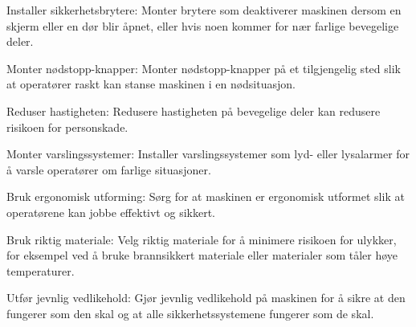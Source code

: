 \documentclass[aspectratio=169,xcolor=dvipsnames]{beamer}
\begin{document}
\begin{frame}
\begin{itemize}
{Installer sikkerhetsbrytere: Monter brytere som deaktiverer maskinen dersom en skjerm eller en dør blir åpnet, eller hvis noen kommer for nær farlige bevegelige deler.

Monter nødstopp-knapper: Monter nødstopp-knapper på et tilgjengelig sted slik at operatører raskt kan stanse maskinen i en nødsituasjon.

Reduser hastigheten: Redusere hastigheten på bevegelige deler kan redusere risikoen for personskade.

Monter varslingssystemer: Installer varslingssystemer som lyd- eller lysalarmer for å varsle operatører om farlige situasjoner.

Bruk ergonomisk utforming: Sørg for at maskinen er ergonomisk utformet slik at operatørene kan jobbe effektivt og sikkert.

Bruk riktig materiale: Velg riktig materiale for å minimere risikoen for ulykker, for eksempel ved å bruke brannsikkert materiale eller materialer som tåler høye temperaturer.

Utfør jevnlig vedlikehold: Gjør jevnlig vedlikehold på maskinen for å sikre at den fungerer som den skal og at alle sikkerhetssystemene fungerer som de skal.

		}
\end{itemize}
\end{frame}
\end{document}

